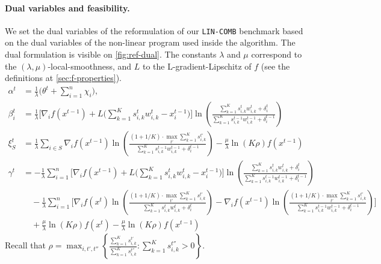 \paragraph{Dual variables and feasibility.} We set the dual variables of the reformulation of our \texttt{LIN-COMB} benchmark based on the dual variables of the non-linear program used inside the algorithm. The dual formulation is visible on \cref{fig:ref-dual}. The constants $\lambda$ and $\mu$ correspond to the $(\lambda,\mu)$-local-smoothness, and $L$ to the L-gradient-Lipschitz of $f$ (see the definitions at \cref{sec:f-properties}).
%
\begin{align*}
    \alpha^{t} &= \frac{1}{\lambda}  \biggl( \theta^{t} + \sum_{i=1}^{n} \chi_{i} \biggr), \\
    \beta_{i}^{t} &= \frac{1}{\lambda} \biggl[  \nabla_{i} f(x^{t-1}) + L\biggl( \sum_{k=1}^{K} s_{i,k}^{t} w_{i,k}^{t}  - x_{i}^{t-1} \biggr) \biggr] \ln \left( \frac{\sum_{k=1}^{K} s_{i,k}^{t} w_{i,k}^{t} + \delta_{i}^{t}}{\sum_{k=1}^{K}  s_{i,k}^{t-1}w_{i,k}^{t-1}  + \delta_{i}^{t-1}} \right) \\
    \xi_{S}^{t} &= \frac{1}{\lambda} \sum_{i \in S} \nabla_{i} f(x^{t-1}) \ln \left( \frac{(1 + 1/K) \cdot \max_{t'} \sum_{k=1}^{K} s_{i,k}^{t'}}{\sum_{k=1}^{K}  s_{i,k}^{t-1}w_{i,k}^{t-1}  + \delta_{i}^{t-1}} \right) - \frac{\mu}{\lambda} \ln(K\rho)  f(x^{t-1})\\
    \gamma^{t} &= -  \frac{1}{\lambda} \sum_{i=1}^{n} \biggl[  \nabla_{i} f(x^{t-1}) + L\biggl( \sum_{k=1}^{K} s_{i,k}^{t} w_{i,k}^{t}  - x_{i}^{t-1} \biggr) \biggr]  \ln \left( \frac{\sum_{k=1}^{K} s_{i,k}^{t} w_{i,k}^{t} + \delta_{i}^{t}}{\sum_{k=1}^{K}  s_{i,k}^{t-1}w_{i,k}^{t-1}  + \delta_{i}^{t-1}} \right) \\
        & \quad - \frac{1}{\lambda} \sum_{i=1}^{n} \biggl[ \nabla_{i} f(x^{t}) \ln \left( \frac{(1 + 1/K) \cdot \max_{t'} \sum_{k=1}^{K} s_{i,k}^{t'}}{\sum_{k=1}^{K}  s_{i,k}^{t}w_{i,k}^{t}  + \delta_{i}^{t}} \right) -  \nabla_{i} f(x^{t-1}) \ln \left( \frac{(1 + 1/K) \cdot \max_{t'} \sum_{k=1}^{K} s_{i,k}^{t'}}{\sum_{k=1}^{K}  s_{i,k}^{t-1}w_{i,k}^{t-1}  + \delta_{i}^{t-1}} \right) \biggr] \\
    & \quad + \frac{\mu}{\lambda} \ln(K\rho) f(x^{t}) - \frac{\mu}{\lambda} \ln(K\rho) f(x^{t-1})
\end{align*}
%
Recall that $\rho = \max_{i, t',t''} \left\{\frac{\sum_{k=1}^{K} s_{i,k}^{t'}}{\sum_{k=1}^{K} s_{i,k}^{t''}} : \sum_{k=1}^{K} s_{i,k}^{t''} > 0 \right\}$.

